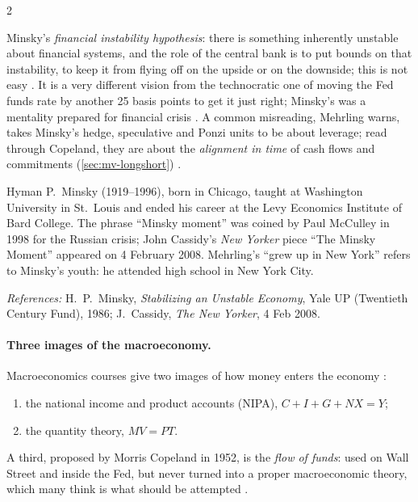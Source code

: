 \begin{paracol}{2}
\begin{reading}
Minsky's \emph{financial instability hypothesis}: there is something inherently unstable about financial systems, and the role of the
central bank is to put bounds on that instability, to keep it from flying off on the upside or on the downside; this is not easy
. It is a very different vision from the technocratic one of moving the Fed funds rate by another 25 basis points to get
it just right; Minsky's was a mentality prepared for financial crisis . A common misreading, Mehrling warns,
takes Minsky's hedge, speculative and Ponzi units to be about leverage; read through Copeland, they are about the \emph{alignment in time}
of cash flows and commitments (\cref{sec:mv-longshort}) .
\end{reading}\begin{history}
Hyman P.~Minsky (1919--1996), born in Chicago, taught at Washington University in St.~Louis and ended his career at the Levy Economics
Institute of Bard College. The phrase ``Minsky moment'' was coined by Paul McCulley in 1998 for the Russian crisis; John Cassidy's
\emph{New Yorker} piece ``The Minsky Moment'' appeared on 4 February 2008. Mehrling's ``grew up in New York'' refers to Minsky's
youth: he attended high school in New York City.\par
\emph{References:} H.~P.~Minsky, \emph{Stabilizing an Unstable Economy}, Yale UP (Twentieth Century Fund), 1986; J.~Cassidy,
\emph{The New Yorker}, 4 Feb 2008.
\end{history}

\paragraph{Three images of the macroeconomy.} Macroeconomics courses give two images of how money enters the economy
:
\begin{enumerate}
  \item the national income and product accounts (NIPA), $C+I+G+NX = Y$;
  \item the quantity theory, $MV = PT$.
\end{enumerate}
A third, proposed by Morris Copeland in 1952, is the \emph{flow of funds}: used on Wall Street and inside the Fed, but never turned into a
proper macroeconomic theory, which many think is what should be attempted .


\end{paracol}
